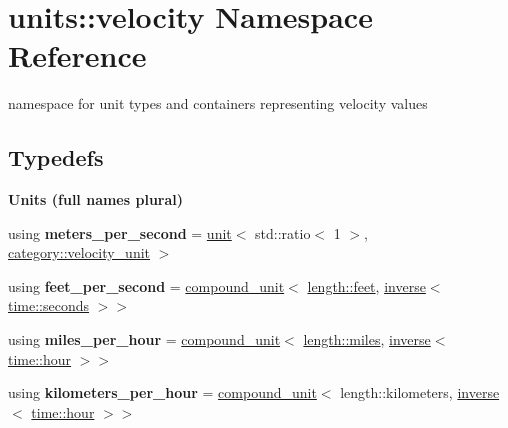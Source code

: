 \hypertarget{namespaceunits_1_1velocity}{}\section{units\+:\+:velocity Namespace Reference}
\label{namespaceunits_1_1velocity}


namespace for unit types and containers representing velocity values  


\subsection*{Typedefs}
\begin{Indent}{\bf Units (full names plural)}\par
\begin{DoxyCompactItemize}
\item 
\hypertarget{namespaceunits_1_1velocity_aff5f1d15bc0dc39adb31b5da5a26cdf0}{}using {\bfseries meters\+\_\+per\+\_\+second} = \hyperlink{structunits_1_1unit}{unit}$<$ std\+::ratio$<$ 1 $>$, \hyperlink{namespaceunits_1_1category_a47c81b9d092be905b13720353ac1d994}{category\+::velocity\+\_\+unit} $>$\label{namespaceunits_1_1velocity_aff5f1d15bc0dc39adb31b5da5a26cdf0}

\item 
\hypertarget{namespaceunits_1_1velocity_acd55e4b440997fbab97deb1d133410b9}{}using {\bfseries feet\+\_\+per\+\_\+second} = \hyperlink{group___unit_types_ga9c3f6f077dc894620e1ed8358442a8f1}{compound\+\_\+unit}$<$ \hyperlink{structunits_1_1unit}{length\+::feet}, \hyperlink{group___unit_manipulators_gaacc539ef162e24b260d023d3ff949b57}{inverse}$<$ \hyperlink{structunits_1_1unit}{time\+::seconds} $>$$>$\label{namespaceunits_1_1velocity_acd55e4b440997fbab97deb1d133410b9}

\item 
\hypertarget{namespaceunits_1_1velocity_a9b70d814244212ef8ed20b4628b08c5e}{}using {\bfseries miles\+\_\+per\+\_\+hour} = \hyperlink{group___unit_types_ga9c3f6f077dc894620e1ed8358442a8f1}{compound\+\_\+unit}$<$ \hyperlink{structunits_1_1unit}{length\+::miles}, \hyperlink{group___unit_manipulators_gaacc539ef162e24b260d023d3ff949b57}{inverse}$<$ \hyperlink{structunits_1_1unit}{time\+::hour} $>$$>$\label{namespaceunits_1_1velocity_a9b70d814244212ef8ed20b4628b08c5e}

\item 
\hypertarget{namespaceunits_1_1velocity_a126b8dd6ff4b1974c4254598f35609f3}{}using {\bfseries kilometers\+\_\+per\+\_\+hour} = \hyperlink{group___unit_types_ga9c3f6f077dc894620e1ed8358442a8f1}{compound\+\_\+unit}$<$ length\+::kilometers, \hyperlink{group___unit_manipulators_gaacc539ef162e24b260d023d3ff949b57}{inverse}$<$ \hyperlink{structunits_1_1unit}{time\+::hour} $>$$>$\label{namespaceunits_1_1velocity_a126b8dd6ff4b1974c4254598f35609f3}


\end{DoxyCompactItemize}
\end{Indent}

